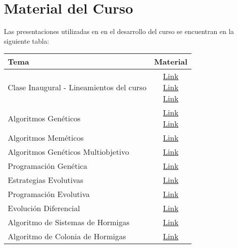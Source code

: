 \chapter{Material del Curso}
\newpage
\pagestyle{empty} %

Las presentaciones utilizadas en en el desarrollo del curso se encuentran en la siguiente tabla:

\begin{table}[h]
\centering
\begin{tabular}{l|c}
\hline
\textbf{Tema} & 
\textbf{Material} 
\\ \hline
Clase Inaugural - Lineamientos del curso &
\makecell{\href{https://drive.google.com/open?id=1qwydD5qh-rL0lNElB6RUV0IB7TPmFbDu}{Link} \\ \href{https://drive.google.com/open?id=15BpLnaM0QLuD2AX-A5CPMJLgLlZBtWDg}{Link} \\ \href{https://drive.google.com/open?id=1ZVtx_l_I-z1AAs3L9YUkX47R4W6n-07m}{Link}}
\\ \hline
Algoritmos Genéticos &
\makecell{\href{https://drive.google.com/open?id=1H0dFhxbFbq1tcdu82QHxME6tU3UV5Ogp}{Link} \\ \href{https://drive.google.com/open?id=1yfn4rpQkEkfKwXS4He1biDaJqvHFy4bn}{Link}}
\\ \hline
Algoritmos Meméticos &
\href{https://drive.google.com/open?id=1BmE4VRW3tNd0Kkb0BdXhRAic9tnbD9u8}{Link}
\\ \hline
Algoritmos Genéticos Multiobjetivo &
\href{https://drive.google.com/open?id=1MjLCnJMdj5wYW3XXI7Ehf2H3YbE8xO1S}{Link}
\\ \hline
Programación Genética &
\href{https://drive.google.com/open?id=1V9SzkwNbOZRyBkbsqnNJIwcu7ShBSaNA}{Link}
\\ \hline
Estrategias Evolutivas &
\href{https://drive.google.com/open?id=1fjFPAOtmi0gLbnPrcZq5oS_tG7WYh1ur}{Link}
\\ \hline
Programación Evolutiva &
\href{https://drive.google.com/open?id=19JJVZs4a8OilISAvDQdfMDQfW3e35nGn}{Link}
\\ \hline
Evolución Diferencial &
\href{https://drive.google.com/open?id=12DA4_Ta7JgZzhAEEeS39SxI3ES14GJFr}{Link}
\\ \hline
Algoritmo de Sistemas de Hormigas &
\href{https://drive.google.com/open?id=1CYvl9v14GuA6vpxtvksW_mUiiYlIR1yU}{Link}
\\ \hline
Algoritmo de Colonia de Hormigas &
\href{https://drive.google.com/open?id=1McKYvfFqinpg0pVNYeX4u3chwWfu7_aT}{Link}

\end{tabular}
\end{table}

